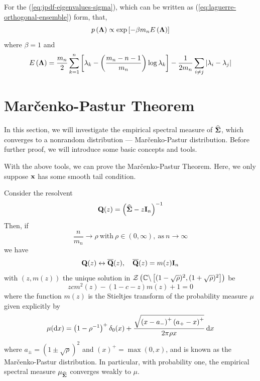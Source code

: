 \begin{remark}
	For the (\ref{eq:jpdf-eigenvalues-sigma}), which can be written as (\ref{eq:laguerre-orthogonal-ensemble}) form, that,
	\begin{equation*}
		p\left(\boldsymbol{\Lambda}\right)\propto\exp\left[-\beta m_{n}E\left(\boldsymbol{\Lambda}\right)\right]
	\end{equation*}
	where \(\beta=1\) and
	\begin{equation*}
		E\left(\boldsymbol{\Lambda}\right)=\frac{m_{n}}{2}\sum_{k=1}^{n}\left[\lambda_{k}-\left(\frac{m_{n}-n-1}{m_{n}}\right)\log\lambda_{k}\right]-\frac{1}{2m_{n}}\sum_{i\neq j}\left|\lambda_{i}-\lambda_{j}\right|
	\end{equation*}
\end{remark}

\section{Mar\v{c}enko-Pastur Theorem}

In this section, we will investigate the empirical spectral measure of \(\widehat{\boldsymbol{\Sigma}}\), which converges to a nonrandom distribution --- Mar\v{c}enko-Pastur distribution. Before further proof, we will introduce some basic concepts and tools.

With the above tools, we can prove the Mar\v{c}enko-Pastur Theorem. Here, we only suppose \(\mathbf{x}\) has some smooth tail condition.
\begin{theorem}\label{thm:marcenko-pastur-theorem}
	Consider the resolvent
	\begin{equation*}
		\mathbf{Q}(z)=\left(\widehat{\boldsymbol{\Sigma}}-z\mathbf{I}_{n}\right)^{-1}
	\end{equation*}
	Then, if
	\begin{equation*}
		\frac{n}{m_{n}}\rightarrow\rho\ \text{with}\ \rho\in(0,\infty),\ \text{as}\ n\rightarrow\infty
	\end{equation*}
	we have
	\begin{equation*}
		\mathbf{Q}(z)\leftrightarrow\overline{\mathbf{Q}}(z),\quad\overline{\mathbf{Q}}(z)=m(z)\mathbf{I}_{n}
	\end{equation*}
	with \((z,m(z))\) the unique solution in \(\mathcal{Z}\left(\mathbb{C}\backslash\left[(1-\sqrt{\rho})^{2},(1+\sqrt{\rho})^{2}\right]\right)\) be
	\begin{equation*}
		zcm^{2}(z)-(1-c-z)m(z)+1=0
	\end{equation*}
	where the function \(m(z)\) is the Stieltjes transform of the probability measure \(\mu\) given explicitly by
	\begin{equation*}
		\mu(\mathop{}\!\mathrm{d} x)=\left(1-\rho^{-1}\right)^{+}\delta_{0}(x)+\frac{\sqrt{\left(x-a_{-}\right)^{+}\left(a_{+}-x\right)^{+}}}{2\pi\rho x}\mathop{}\!\mathrm{d} x
	\end{equation*}
	where \(a_{\pm}=(1 \pm \sqrt{\rho})^{2}\) and \((x)^{+}=\max (0, x)\), and is known as the Mar\v{c}enko-Pastur distribution. In particular, with probability one, the empirical spectral measure \(\mu_{\widehat{\boldsymbol{\Sigma}}}\) converges weakly to \(\mu \).
\end{theorem}

